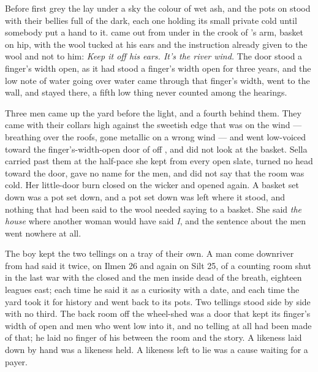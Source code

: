 
Before first grey the  lay under a sky the colour of wet ash, and the pots on  stood with their bellies full of the dark, each one holding its small private cold until somebody put a hand to it.  came out from under  in the crook of 's arm, basket on hip, with the wool tucked at his ears and the instruction already given to the wool and not to him: \emph{Keep it off his ears. It's the river wind.} The door stood a finger's width open, as it had stood a finger's width open for three years, and the low note of water going over water came through that finger's width, went to the wall, and stayed there, a fifth low thing never counted among the hearings.

Three men came up the yard before the light, and a fourth behind them. They came with their collars high against the sweetish edge that was on the wind ---  breathing over the roofs,  gone metallic on a wrong wind --- and went low-voiced toward the finger's-width-open door of  off , and did not look at the basket. Sella carried past them at the half-pace she kept from every open slate, turned no head toward the door, gave  no name for the men, and did not say that the room was cold. Her little-door burn closed on the wicker and opened again. A basket set down was a pot set down, and a pot set down was left where it stood, and nothing that had been said to the wool needed saying to a basket. She said \emph{the house} where another woman would have said \emph{I}, and the sentence about the men went nowhere at all.

The boy kept the two tellings on a tray of their own. A man come downriver from  had said it twice, on Ilmen 26 and again on Silt 25, of a counting room shut in the last war with the  closed and the men inside dead of the breath, eighteen leagues east; each time he said it as a curiosity with a date, and each time the yard took it for history and went back to its pots. Two tellings stood side by side with no third. The back room off the wheel-shed was a door that kept its finger's width of open and men who went low into it, and no telling at all had been made of that; he laid no finger of his between the room and the story. A likeness laid down by hand was a likeness held. A likeness left to lie was a cause waiting for a payer.

